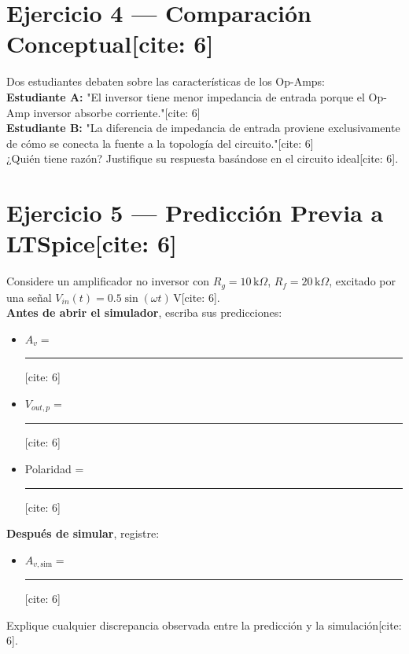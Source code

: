 \documentclass[11pt, a4paper]{article}
\begin{document}
\section*{Ejercicio 4 — Comparación Conceptual[cite: 6]}
Dos estudiantes debaten sobre las características de los Op-Amps: \\
\textbf{Estudiante A:} "El inversor tiene menor impedancia de entrada porque el Op-Amp inversor absorbe corriente."[cite: 6] \\
\textbf{Estudiante B:} "La diferencia de impedancia de entrada proviene exclusivamente de cómo se conecta la fuente a la topología del circuito."[cite: 6] \\
¿Quién tiene razón? Justifique su respuesta basándose en el circuito ideal[cite: 6].

\section*{Ejercicio 5 — Predicción Previa a LTSpice[cite: 6]}
Considere un amplificador no inversor con $R_g = 10\,\text{k}\Omega$, $R_f = 20\,\text{k}\Omega$, excitado por una señal $V_{in}(t) = 0.5\sin(\omega t)\,\text{V}$[cite: 6]. \\
\textbf{Antes de abrir el simulador}, escriba sus predicciones:
\begin{itemize}
    \item $A_v =$ \rule{2cm}{0.4pt}[cite: 6]
    \item $V_{out, p} =$ \rule{2cm}{0.4pt}[cite: 6]
    \item Polaridad = \rule{2cm}{0.4pt}[cite: 6]
\end{itemize}
\textbf{Después de simular}, registre:
\begin{itemize}
    \item $A_{v, \text{sim}} =$ \rule{2cm}{0.4pt}[cite: 6]
\end{itemize}
Explique cualquier discrepancia observada entre la predicción y la simulación[cite: 6].
\end{document}
